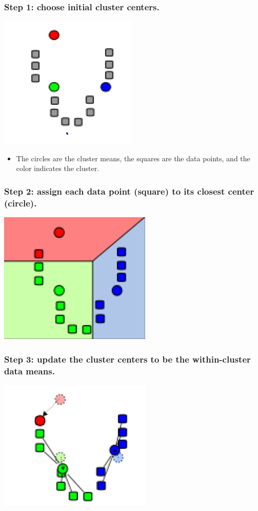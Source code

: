 \documentclass[handout]{beamer}
\numberwithin{equation}{section}
\begin{document}
\begin{frame}
\frametitle{Step 1: choose initial cluster centers.}
\begin{center}
\includegraphics[scale=.6]{../../fig/kmeans1.png}
\end{center}
\begin{itemize}
\item The circles are the cluster means, the squares are the data points, and the color indicates the cluster.
\end{itemize}
\end{frame}

\begin{frame}
\frametitle{Step 2: assign each data point (square) to its closest center (circle).}
\begin{center}
\includegraphics[scale=.6]{../../fig/kmeans2.png}
\end{center}
\end{frame}

\begin{frame}
\frametitle{Step 3: update the cluster centers to be the within-cluster data means.}
\begin{center}
\includegraphics[scale=.6]{../../fig/kmeans3.png}
\end{center}
\end{frame}
\end{document}
